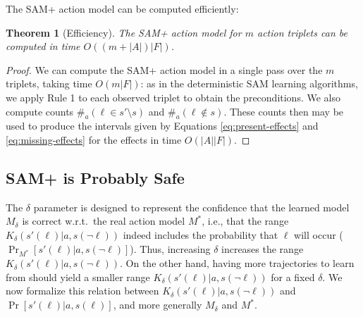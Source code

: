 \documentclass[letterpaper]{article} %
\newtheorem{theorem}{Theorem}
\newcommand{\tuple}[1]{\ensuremath{\left \langle #1 \right \rangle }}
\begin{document}

 The SAM+ action model can be computed efficiently:
\begin{theorem}[Efficiency]
The SAM+ action model for $m$ action triplets can be computed in time $O((m+|A|)|F|)$.
\end{theorem}
\begin{proof}
We can compute the SAM+ action model in a single pass over the $m$ triplets, taking time $O(m|F|)$: as in the deterministic SAM learning algorithms, we apply Rule 1 to each observed triplet to obtain the preconditions. We also compute counts $\#_a(\ell\in s'\setminus s)$ and $\#_a(\ell\notin s)$. These counts then may be used to produce the intervals given by Equations \ref{eq:present-effects} and \ref{eq:missing-effects} for the effects in time $O(|A||F|)$.
\end{proof}


\subsection{SAM+ is Probably Safe}

The $\delta$ parameter is designed to represent the confidence that the learned model $M_\delta$ is correct w.r.t.\ the real action model $M^*$, i.e., that the range $K_\delta(s'(\ell)|a,s(\neg\ell))$ indeed includes the probability that $\ell$ will occur ($\Pr_{M^*}[s'(\ell)|a,s(\neg\ell)]$). 
Thus, increasing $\delta$ increases the range $K_\delta(s'(\ell)|a,s(\neg\ell))$. 
On the other hand, having more trajectories to learn from should yield a smaller range $K_\delta(s'(\ell)|a,s(\neg\ell))$ for a fixed $\delta$. %
We now formalize this relation between $K_\delta(s'(\ell)|a,s(\neg\ell))$ and $\Pr[s'(\ell)|a,s(\ell)]$, and more generally $M_\delta$ and $M^*$. 
\end{document}
